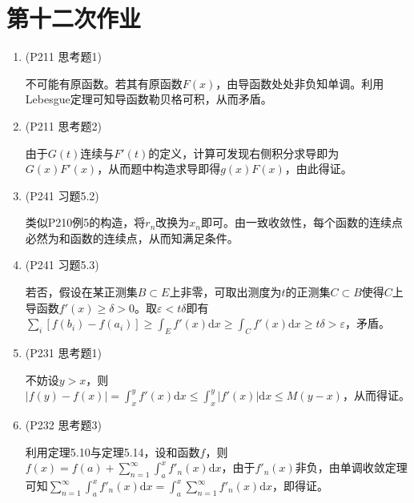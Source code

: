 \documentclass[a4paper,UTF8,fontset=windows]{ctexart}
\begin{document}
\section{第十二次作业}
\begin{enumerate}
    \item (P211 思考题1)
    
    不可能有原函数。若其有原函数$F(x)$，由导函数处处非负知单调。利用Lebesgue定理可知导函数勒贝格可积，从而矛盾。
    
    \item (P211 思考题2)
    
    由于$G(t)$连续与$F'(t)$的定义，计算可发现右侧积分求导即为$G(x)F'(x)$，从而题中构造求导即得$g(x)F(x)$，由此得证。
    
    \item (P241 习题5.2)
    
    类似P210例5的构造，将$r_n$改换为$x_n$即可。由一致收敛性，每个函数的连续点必然为和函数的连续点，从而知满足条件。
    
    \item (P241 习题5.3)
    
    若否，假设在某正测集$B\subset E$上非零，可取出测度为$t$的正测集$C\subset B$使得$C$上导函数$f'(x)\ge\delta>0$。取$\varepsilon<t\delta$即有$\sum_i[f(b_i)-f(a_i)]\ge\int_Ef'(x)\mathrm{d}x\ge\int_Cf'(x)\mathrm{d}x\ge t\delta>\varepsilon$，矛盾。
    
    \item (P231 思考题1)
    
    不妨设$y>x$，则$|f(y)-f(x)|=\int_x^yf'(x)\mathrm{d}x\le\int_x^y|f'(x)|\mathrm{d}x\le M(y-x)$，从而得证。
    
    \item (P232 思考题3)
    
    利用定理5.10与定理5.14，设和函数$f$，则$f(x)=f(a)+\sum_{n=1}^\infty\int_a^xf'_n(x)\mathrm{d}x$，由于$f'_n(x)$非负，由单调收敛定理可知$\sum_{n=1}^\infty\int_a^xf'_n(x)\mathrm{d}x=\int_a^x\sum_{n=1}^\infty f'_n(x)\mathrm{d}x$，即得证。
\end{enumerate}
\end{document}
